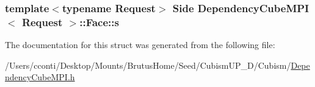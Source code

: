\subsubsection[{s}]{\setlength{\rightskip}{0pt plus 5cm}template$<$typename Request$>$ Side {\bf Dependency\+Cube\+M\+P\+I}$<$ Request $>$\+::Face\+::s}\label{struct_dependency_cube_m_p_i_1_1_face_a0f93c85a3376303880fc199236b0e3da}


The documentation for this struct was generated from the following file\+:\begin{DoxyCompactItemize}
\item 
/\+Users/cconti/\+Desktop/\+Mounts/\+Brutus\+Home/\+Seed/\+Cubism\+U\+P\+\_\+D/\+Cubism/\hyperlink{_dependency_cube_m_p_i_8h}{Dependency\+Cube\+M\+P\+I.\+h}\end{DoxyCompactItemize}

